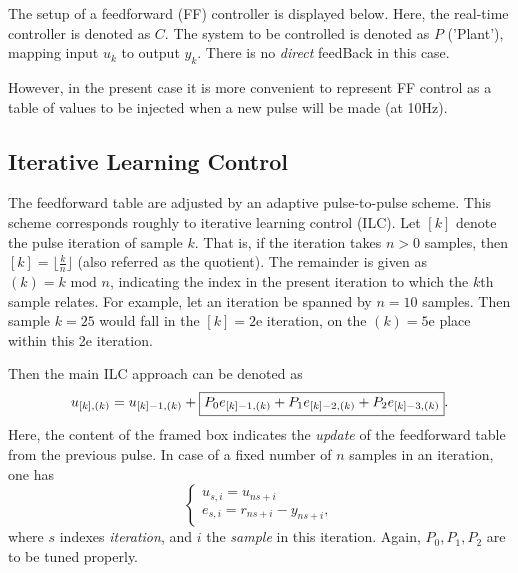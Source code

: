 \documentclass[12pt]{amsart}
\begin{document}
The setup of a feedforward (FF) controller is displayed below.
Here, the real-time controller is denoted as $C$.
The system to be controlled is denoted as $P$ ('Plant'), mapping
input $u_k$ to output $y_k$. There is no {\em direct} feedBack in this case.


However, in the present case it is more convenient to represent FF control as a table of values to be 
injected when a new pulse will be made (at 10Hz).


\subsection{Iterative Learning Control}

The feedforward table are adjusted by an adaptive pulse-to-pulse scheme.
This scheme corresponds roughly to iterative learning control (ILC).
Let $[k]$ denote the pulse iteration of sample $k$.
That is, if the iteration takes $n>0$ samples, then $[k]= \lfloor \frac{k}{n}\rfloor$ (also referred as the quotient).
The remainder is given as $(k) = k \mbox{ \ mod \ } n$, indicating the index in the present 
iteration to which the $k$th sample relates.
For example, let an iteration be spanned by $n=10$ samples. Then sample $k=25$ would fall in the $[k]=2$e iteration, 
on the $(k)=5$e place within this 2e iteration. 

Then the main ILC approach can be denoted as 
\begin{equation}
	u_{[k],(k)} = u_{[k]-1, (k)} + \fbox{$P_0 e_{[k]-1,(k)} +  P_1 e_{[k]-2,(k)} +  P_2 e_{[k]-3,(k)}$}.
	\label{eq.ilc}
\end{equation}
Here, the content of the framed box indicates the {\em update} of the feedforward table from the previous pulse.
In case of a fixed number of $n$ samples in an iteration, one has 
\begin{equation}
		\begin{cases}
			u_{s,i} = u_{ns+i}\\
			e_{s,i} = r_{ns+i} - y_{ns+i},
		\end{cases}
	\label{eq.ilc2}
\end{equation}
where $s$ indexes {\em iteration}, and $i$ the {\em sample} in this iteration.
Again, $P_0,P_1,P_2$ are to be tuned properly.
\end{document}
